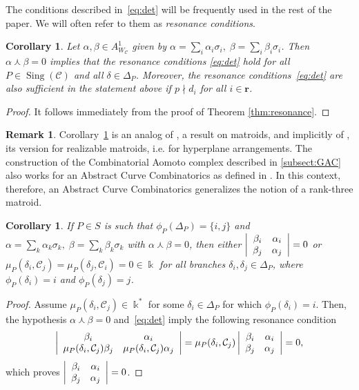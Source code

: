 \documentclass[11pt]{amsart}
\DeclareMathOperator{\Sing}{Sing}
\def\cC{\mathcal{C}}
\def\kk{\Bbbk}
\theoremstyle{plain}
\newtheorem{corollary}[thm]{Corollary}
\theoremstyle{definition}
\newtheorem{remark}[thm]{Remark}
\begin{document}
The conditions described in~\eqref{eq:det} will be frequently used in the rest of the paper. We will often refer to them as \emph{resonance conditions}.

\begin{corollary}
\label{cor:eq_det}
Let $\alpha, \beta \in A^1_{W_\cC}$ given by $\alpha = \sum_i \alpha_i \sigma_i, \; \beta = \sum_i \beta_i \sigma_i$. Then $\alpha \curlywedge \beta=0$ implies that the resonance conditions \eqref{eq:det} hold for all $P \in \Sing(\cC)$ and all $\delta \in \Delta_P$. Moreover, the resonance conditions~\eqref{eq:det} are also sufficient in the statement above if $p\nmid d_i$ for all $i\in\mathbf{r}$.
\end{corollary}

\begin{proof}
It follows immediately from the proof of Theorem \ref{thm:resonance}.
\end{proof}

\begin{remark}
\label{rem:Falk_matroid_thms}
Corollary~\ref{cor:eq_det} is an analog of \cite[Theorem 3.5]{F}, a result on matroids, and implicitly of \cite[Theorem 2.5]{F2}, its version for realizable matroids, i.e. for hyperplane arrangements. The construction of the Combinatorial Aomoto complex described in \ref{subsect:GAC} also works for an Abstract Curve Combinatorics as defined in \cite{BC}. In this context, therefore, an Abstract Curve Combinatorics generalizes the notion of a rank-three matroid.
\end{remark}

\begin{corollary}
\label{cor:double_points}
If $P \in S$ is such that $
\phi_P(\Delta_P)= \{i,j\}$ %
and $\alpha = \sum_k \alpha_k \sigma_k, \; \beta = \sum_k \beta_k \sigma_k$ with $\alpha \curlywedge \beta= 0$, then either $\left| \array{cc} \beta_i & \alpha_i \\
\beta_j & \alpha_j \endarray \right| =0$
or $\mu_P(\delta_i, \cC_j) = \mu_P(\delta_j, \cC_i) = 0 \in \kk$ for all branches $\delta_i, \delta_j \in \Delta_P$, where $\phi_P(\delta_i) = i$ and $\phi_P(\delta_j) = j$.
\end{corollary}

\begin{proof}
Assume $\mu_P(\delta_i, \cC_j) \in\kk^*$ for some $\delta_i\in\Delta_P$ for which $\phi_P(\delta_i)=i$. Then, the hypothesis 
$\alpha \curlywedge \beta= 0$ and~\eqref{eq:det} imply the following resonance condition
$$
\left| \array{cc} \beta_i & \alpha_i \\
\mu_P(\delta_i,\cC_j)\beta_j & \mu_P(\delta_i,\cC_j)\alpha_j \endarray \right|= 
\mu_P(\delta_i,\cC_j)
\left| \array{cc} \beta_i & \alpha_i \\
\beta_j & \alpha_j \endarray \right| = 0,
$$
which proves $\left| \array{cc} \beta_i & \alpha_i \\ \beta_j & \alpha_j \endarray \right| = 0$.
\end{proof}
\end{document}
